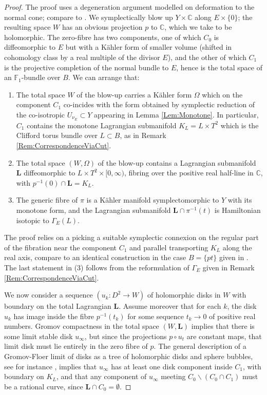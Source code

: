 \documentclass[reqno,10pt]{amsart}
\numberwithin{equation}{section}
\newcommand{\bC}{{\mathbb C}}
\newcommand{\bF}{{\mathbb F}}
\theoremstyle{remark}
\begin{document}
\begin{proof}
The proof uses a degeneration argument modelled on deformation to the normal cone; compare to \cite[Section 5]{Seidel:Flux}.  We symplectically blow up $Y\times \bC$ along $E\times \{0\}$; the resulting space $W$ has an obvious projection $p$ to $\bC$, which we take to be holomorphic.  The zero-fibre has two components, one of which $C_0$ is diffeomorphic to $E$ but with a K\"ahler form of smaller volume (shifted in cohomology class by a real multiple of the divisor $E$), and the other of which $C_1$ is the projective completion of the normal bundle to $E$, hence is the total space of an $\bF_1$-bundle over $B$.  We can arrange that:
\begin{enumerate}
\item The total space $W$ of the blow-up carries a K\"ahler form $\Omega$ which on the component $C_1$ co-incides with the form obtained by symplectic reduction of the co-isotropic $U_{\nu_E} \subset Y$ appearing in Lemma \ref{Lem:Monotone}. In particular, $C_1$ contains the monotone Lagrangian submanifold $K_L= L\times T^2$ which is the Clifford torus bundle over $L\subset B$, as in Remark \ref{Rem:CorrespondenceViaCut}. 
\item The total space $(W, \Omega)$ of the blow-up contains a Lagrangian submanifold $\textbf{L}$ diffeomorphic to $L \times T^2 \times [0,\infty)$, fibring over the positive real half-line in $\bC$, with $p^{-1}(0) \cap \textbf{L} = K_L$.
\item The generic fibre of $\pi$ is a K\"ahler manifold symplectomorphic to $Y$ with its monotone form, and the Lagrangian submanifold $\textbf{L} \cap \pi^{-1}(t)$ is Hamiltonian isotopic to $\Gamma_E(L)$.
\end{enumerate}
The proof relies on a picking a suitable symplectic connexion on the regular part of the fibration near the component $C_1$ and parallel transporting $K_L$ along the real axis, compare to an identical construction in the case $B=\{pt\}$ given in \cite[Section 4]{SeidelSmith:Ramanujam}. The last statement in (3) follows from the reformulation of $\Gamma_E$ given in Remark \ref{Rem:CorrespondenceViaCut}.

We now consider a sequence $(u_k: D^2 \rightarrow W)$ of holomorphic disks in $W$ with boundary on the total Lagrangian $\textbf{L}$.  Assume moreover that for each $k$, the disk $u_k$ has image inside the fibre $p^{-1}(t_k)$ for some sequence $t_k \rightarrow 0$ of positive real numbers.  Gromov compactness in the total space $(W,\textbf{L})$ implies that there is some limit stable disk $u_{\infty}$, but since the projections $p\circ u_t$ are constant maps, that limit disk must lie entirely in the zero fibre of $p$.  The general description of a Gromov-Floer limit of disks as a tree of holomorphic disks and sphere bubbles, see for instance \cite{Frauenfelder},  implies that $u_{\infty}$ has at least one disk component inside $C_1$, with boundary on $K_L$, and that any component of $u_{\infty}$ meeting $C_0 \backslash (C_0 \cap C_1)$ must be a rational curve, since $\textbf{L} \cap C_0 = \emptyset$.


\end{proof}
\end{document}

